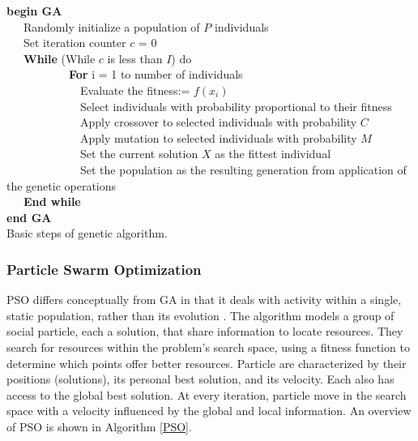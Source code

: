\documentclass{tamuccthesis}
\begin{document}
\begin{algorithm}%
\textbf{begin GA}\\
~~~Randomly initialize a population of $P$ individuals\\
~~~Set iteration counter $c$ = 0 \\
~~~\textbf{While} (While $c$ is less than $I$) do\\
~~~~~~~~~~~\textbf{For} i = 1 to number of individuals \\
 ~~~~~~~~~~~~~Evaluate the fitness:= $ f(x_i)$\\
 ~~~~~~~~~~~~~Select individuals with probability proportional to their fitness \\
 ~~~~~~~~~~~~~Apply crossover to selected individuals with probability $C$\\
 ~~~~~~~~~~~~~Apply mutation to selected individuals with probability $M$ \\
 ~~~~~~~~~~~~~Set the current solution $X$ as the fittest individual \\
 ~~~~~~~~~~~~~Set the population as the resulting generation from application of the genetic operations\\
~~~\textbf{End while} \\
\textbf{end GA}\\
\caption[Basic steps of genetic algorithm.]{Basic steps of genetic algorithm.}
\label{GA}
\end{algorithm}

\subsubsection{Particle Swarm Optimization}

PSO differs conceptually from GA in that it deals with activity within a single, static population, rather than its evolution \cite{pso:nie:2016}. The algorithm models a group of social particle, each a solution, that share information to locate resources. They search for resources within the problem's search space, using a fitness function to determine which points offer better resources. Particle are characterized by their positions (solutions), its personal best solution, and its velocity. Each also has access to the global best solution. At every iteration, particle move in the search space with a velocity influenced by the global and local information. An overview of PSO is shown in Algorithm \ref{PSO}.
\end{document}
